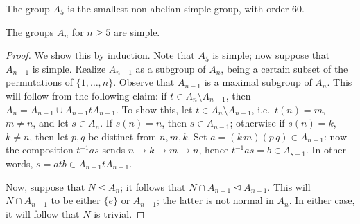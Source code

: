 \documentclass[11pt]{article}
\theoremstyle{definition}
\theoremstyle{remark}
\numberwithin{equation}{section}
\begin{document}
    \begin{theorem}
        The group $A_5$ is the smallest non-abelian simple group, with order $60$.
    \end{theorem}

    \begin{theorem}
        The groups $A_n$ for $n \geq 5$ are simple.
    \end{theorem}
    \begin{proof}
        We show this by induction. Note that $A_5$ is simple; now suppose that $A_{n
        - 1}$ is simple. Realize $A_{n - 1}$ as a subgroup of $A_n$, being a certain
        subset of the permutations of $\{1, \dots, n\}$. Observe that $A_{n - 1}$ is
        a maximal subgroup of $A_n$. This will follow from the following claim: if $t
        \in A_n \setminus A_{n - 1}$, then $A_n = A_{n - 1} \cup A_{n - 1}tA_{n -
        1}$. To show this, let $t \in A_{n} \setminus A_{n - 1}$, i.e.\ $t(n) = m$,
        $m \neq n$, and let $s \in A_n$. If $s(n) = n$, then $s \in A_{n - 1}$;
        otherwise if $s(n) = k$, $k \neq n$, then let $p, q$ be distinct from $n, m,
        k$. Set $a = (k\, m)(p\, q) \in A_{n - 1}$: now the composition $t^{-1}as$
        sends $n \to k \to m \to n$, hence $t^{-1}as = b \in A_{s - 1}$. In other
        words, $s = atb \in A_{n - 1}tA_{n - 1}$.

        Now, suppose that $N \trianglelefteq A_n$; it follows that $N \cap A_{n - 1}
        \trianglelefteq A_{n - 1}$. This will $N \cap A_{n - 1}$ to be either $\{e\}$
        or $A_{n - 1}$; the latter is not normal in $A_n$. In either case, it will
        follow that $N$ is trivial.
    \end{proof}
\end{document}
